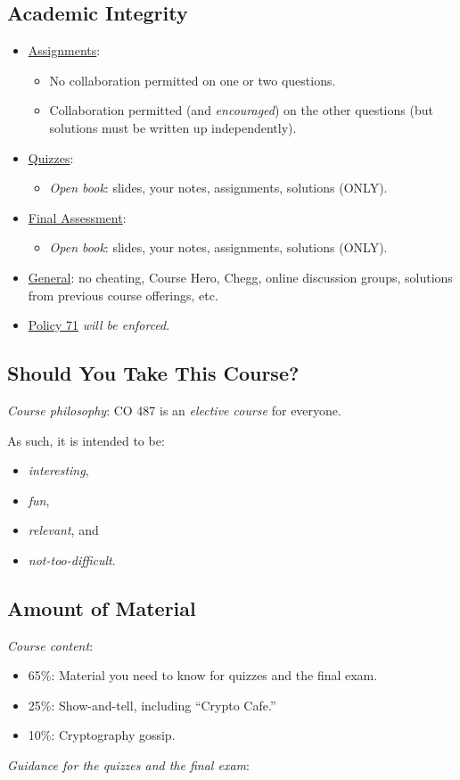 \subsection*{Academic Integrity}
\begin{itemize}
    \item \underline{Assignments}:
          \begin{itemize}
              \item No collaboration permitted on one or two questions.
              \item Collaboration permitted (and \emph{encouraged}) on the other
                    questions (but solutions must be written up independently).
          \end{itemize}
    \item \underline{Quizzes}:
          \begin{itemize}
              \item \emph{Open book}: slides, your notes, assignments, solutions
                    (ONLY).
          \end{itemize}
    \item \underline{Final Assessment}:
          \begin{itemize}
              \item \emph{Open book}: slides, your notes, assignments, solutions
                    (ONLY).
          \end{itemize}
    \item \underline{General}: no cheating, Course Hero, Chegg, online discussion
          groups, solutions from previous course offerings, etc.
    \item \underline{Policy 71} \emph{will be enforced}.
\end{itemize}
\subsection*{Should You Take This Course?}
\emph{Course philosophy}: CO 487 is an \emph{elective course} for everyone.

As such, it is intended to be:
\begin{itemize}
    \item \emph{interesting},
    \item \emph{fun},
    \item \emph{relevant}, and
    \item \emph{not-too-difficult}.
\end{itemize}
\subsection*{Amount of Material}
\emph{Course content}:
\begin{itemize}
    \item 65\%: Material you need to know for quizzes and the final exam.
    \item 25\%: Show-and-tell, including ``Crypto Cafe.''
    \item 10\%: Cryptography gossip.
\end{itemize}
\emph{Guidance for the quizzes and the final exam}:

